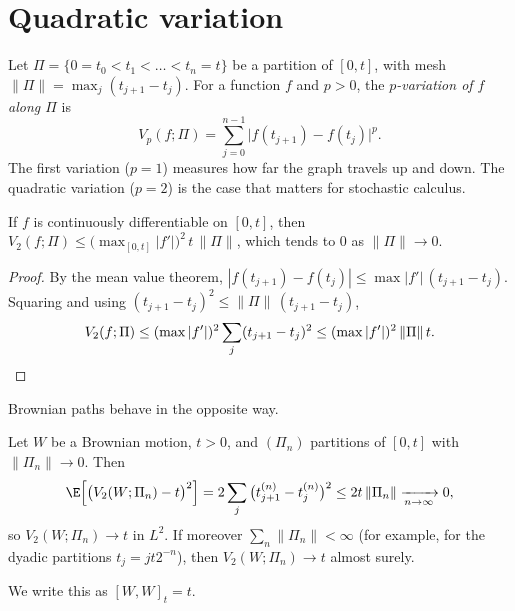 
\section{Quadratic variation}\label{sec:bm-qv}

Let $\Pi=\{0=t_0<t_1<\dots<t_n=t\}$ be a partition of $[0,t]$, with mesh
$\|\Pi\|=\max_j(t_{j+1}-t_j)$. For a function $f$ and $p>0$, the
\emph{$p$-variation of $f$ along $\Pi$} is
\[
  V_p(f;\Pi)=\sum_{j=0}^{n-1}\big|f(t_{j+1})-f(t_j)\big|^p .
\]
The first variation ($p=1$) measures how far the graph travels up and down. The
quadratic variation ($p=2$) is the case that matters for stochastic calculus.

\begin{lemma}\label{lem:bm-smooth}
If $f$ is continuously differentiable on $[0,t]$, then
$V_2(f;\Pi)\le\big(\max_{[0,t]}|f'|\big)^2\,t\,\|\Pi\|$, which tends to $0$ as
$\|\Pi\|\to0$.
\end{lemma}

\begin{proof}
By the mean value theorem,
$|f(t_{j+1})-f(t_j)|\le\max|f'|\,(t_{j+1}-t_j)$. Squaring and using
$(t_{j+1}-t_j)^2\le\|\Pi\|\,(t_{j+1}-t_j)$,
\[
  V_2(f;\Pi)\le(\max|f'|)^2\sum_j(t_{j+1}-t_j)^2\le(\max|f'|)^2\,\|\Pi\|\,t .\qedhere
\]
\end{proof}

Brownian paths behave in the opposite way.

\begin{theorem}\label{thm:bm-qv}
Let $W$ be a Brownian motion, $t>0$, and $(\Pi_n)$ partitions of $[0,t]$ with
$\|\Pi_n\|\to0$. Then
\begin{equation}\label{eq:bm-qv-l2}
  \E\Big[\big(V_2(W;\Pi_n)-t\big)^2\Big]=2\sum_j\big(t^{(n)}_{j+1}-t^{(n)}_j\big)^2\le2t\,\|\Pi_n\|
  \xrightarrow[n\to\infty]{}0,
\end{equation}
so $V_2(W;\Pi_n)\to t$ in $L^2$. If moreover $\sum_n\|\Pi_n\|<\infty$ (for example, for the
dyadic partitions $t_j=jt2^{-n}$), then $V_2(W;\Pi_n)\to t$ almost surely.
\end{theorem}

We write this as $[W,W]_t=t$.

